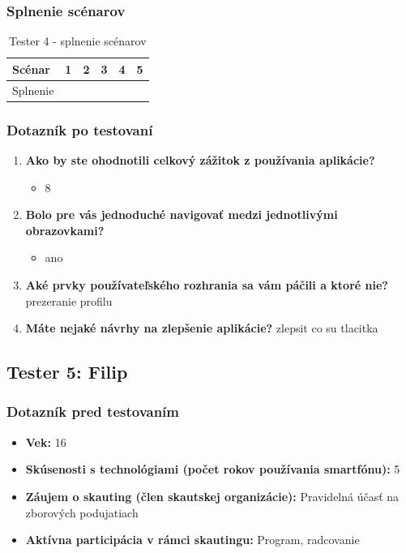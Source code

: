 \subsubsection*{Splnenie scénarov}
\begin{table}[h!]
    \centering
    \begin{tabular}{|l|p{1.5cm}|p{1.5cm}|p{1.5cm}|p{1.5cm}|p{1.5cm}|}
        \hline
        Scénar & 1 & 2 & 3 & 4 & 5 \\ \hline
        Splnenie & & & & & \\ \hline
    \end{tabular}
    \caption{Tester 4 - splnenie scénarov}
\end{table}

\subsubsection*{Dotazník po testovaní}
\begin{enumerate}[leftmargin=*]
    \item \textbf{Ako by ste ohodnotili celkový zážitok z používania aplikácie?}
    \begin{itemize}
        \item 8
    \end{itemize}
    \item \textbf{Bolo pre vás jednoduché navigovať medzi jednotlivými obrazovkami?}
    \begin{itemize}
        \item ano
    \end{itemize}
    \item \textbf{Aké prvky používateľského rozhrania sa vám páčili a ktoré nie?} prezeranie profilu
    \item \textbf{Máte nejaké návrhy na zlepšenie aplikácie?} zlepsit co su tlacitka
\end{enumerate}

\subsection*{Tester 5: Filip}
\subsubsection*{Dotazník pred testovaním}
\begin{itemize}[leftmargin=*]
    \item \textbf{Vek:} 16
    \item \textbf{Skúsenosti s technológiami (počet rokov používania smartfónu):} 5
    \item \textbf{Záujem o skauting (člen skautskej organizácie):} Pravidelná účasť na zborových podujatiach
    \item \textbf{Aktívna participácia v rámci skautingu:} Program, radcovanie
\end{itemize}

